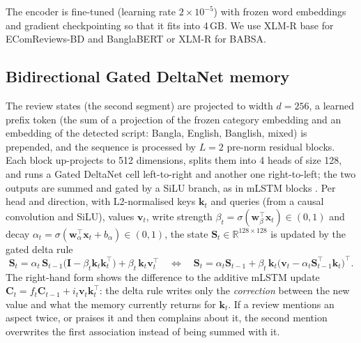 \documentclass[11pt]{article}
\begin{document}
The encoder is fine-tuned (learning rate $2\times10^{-5}$) with frozen word embeddings and gradient
checkpointing \citep{chen2016checkpointing} so that it fits into 4\,GB. We use XLM-R base
\citep{conneau2020xlmr} for EComReviews-BD and BanglaBERT \citep{bhattacharjee2022banglabert} or XLM-R
for BABSA.

\subsection{Bidirectional Gated DeltaNet memory}
The review states (the second segment) are projected to width $d{=}256$, a learned prefix token (the
sum of a projection of the frozen category embedding and an embedding of the detected script:
Bangla, English, Banglish, mixed) is prepended, and the sequence is processed by $L{=}2$ pre-norm
residual blocks. Each block up-projects to 512 dimensions, splits them into 4 heads of size 128, and
runs a Gated DeltaNet cell \citep{yang2025gdn} left-to-right and another one right-to-left; the two
outputs are summed and gated by a SiLU branch, as in mLSTM blocks \citep{beck2024xlstm}. Per head and
direction, with L2-normalised keys $\mathbf{k}_t$ and queries (from a causal convolution and SiLU),
values $\mathbf{v}_t$, write strength $\beta_t=\sigma(\mathbf{w}_\beta^\top\mathbf{x}_t)\in(0,1)$ and
decay $\alpha_t=\sigma(\mathbf{w}_\alpha^\top\mathbf{x}_t+b_\alpha)\in(0,1)$, the state
$\mathbf{S}_t\in\mathbb{R}^{128\times128}$ is updated by the gated delta rule
\begin{equation}
\mathbf{S}_t = \alpha_t\,\mathbf{S}_{t-1}\big(\mathbf{I}-\beta_t\mathbf{k}_t\mathbf{k}_t^\top\big) + \beta_t\,\mathbf{k}_t\mathbf{v}_t^\top
\quad\Longleftrightarrow\quad
\mathbf{S}_t = \alpha_t\mathbf{S}_{t-1} + \beta_t\,\mathbf{k}_t\big(\mathbf{v}_t - \alpha_t\mathbf{S}_{t-1}^\top\mathbf{k}_t\big)^\top .
\label{eq:gdn}
\end{equation}
The right-hand form shows the difference to the additive mLSTM update
$\mathbf{C}_t=f_t\mathbf{C}_{t-1}+i_t\mathbf{v}_t\mathbf{k}_t^\top$: the delta rule writes only the
\emph{correction} between the new value and what the memory currently returns for $\mathbf{k}_t$. If a
review mentions an aspect twice, or praises it and then complains about it, the second mention
overwrites the first association instead of being summed with it.
\end{document}
